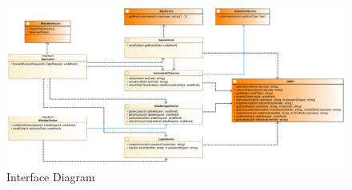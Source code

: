 \begin{figure}[H]
\centering
\includegraphics[width=\linewidth]{resources/uml/Interfacediag}
\caption{Interface Diagram}\label{f:inter_diag}
\end{figure}


